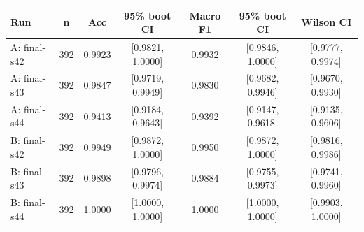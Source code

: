 \begin{tabular}{lcccccc}
\toprule
Run & n & Acc & 95\% boot CI & Macro F1 & 95\% boot CI & Wilson CI \\
\midrule
A: final-s42 & 392 & 0.9923 & [0.9821, 1.0000] & 0.9932 & [0.9846, 1.0000] & [0.9777, 0.9974]\\
A: final-s43 & 392 & 0.9847 & [0.9719, 0.9949] & 0.9830 & [0.9682, 0.9946] & [0.9670, 0.9930]\\
A: final-s44 & 392 & 0.9413 & [0.9184, 0.9643] & 0.9392 & [0.9147, 0.9618] & [0.9135, 0.9606]\\
B: final-s42 & 392 & 0.9949 & [0.9872, 1.0000] & 0.9950 & [0.9872, 1.0000] & [0.9816, 0.9986]\\
B: final-s43 & 392 & 0.9898 & [0.9796, 0.9974] & 0.9884 & [0.9755, 0.9973] & [0.9741, 0.9960]\\
B: final-s44 & 392 & 1.0000 & [1.0000, 1.0000] & 1.0000 & [1.0000, 1.0000] & [0.9903, 1.0000] \\
\bottomrule
\end{tabular}
